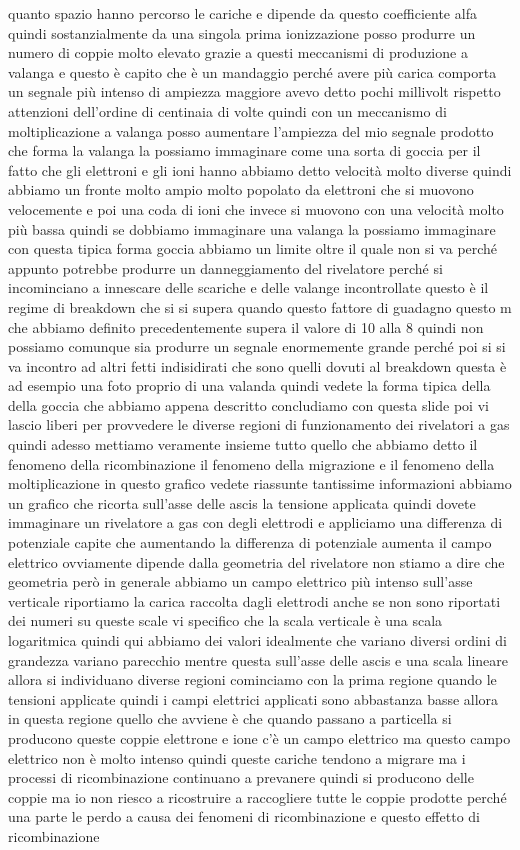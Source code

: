 quanto spazio hanno percorso le cariche e dipende da questo coefficiente alfa quindi sostanzialmente da una singola prima ionizzazione posso produrre un numero di coppie molto elevato grazie a questi meccanismi di produzione a valanga e questo è capito che è un mandaggio perché avere più carica comporta un segnale più intenso di ampiezza maggiore avevo detto pochi millivolt rispetto attenzioni dell'ordine di centinaia di volte quindi con un meccanismo di moltiplicazione a valanga posso aumentare l'ampiezza del mio segnale prodotto che forma la valanga la possiamo immaginare come una sorta di goccia per il fatto che gli elettroni e gli ioni hanno abbiamo detto velocità molto diverse quindi abbiamo un fronte molto ampio molto popolato da elettroni che si muovono velocemente e poi una coda di ioni che invece si muovono con una velocità molto più bassa quindi se dobbiamo immaginare una valanga la possiamo immaginare con questa tipica forma goccia abbiamo un limite oltre il quale non si va perché appunto potrebbe produrre un danneggiamento del rivelatore perché si incominciano a innescare delle scariche e delle valange incontrollate questo è il regime di breakdown che si si supera quando questo fattore di guadagno questo m che abbiamo definito precedentemente supera il valore di 10 alla 8 quindi non possiamo comunque sia produrre un segnale enormemente grande perché poi si si va incontro ad altri fetti indisidirati che sono quelli dovuti al breakdown questa è ad esempio una foto proprio di una valanda quindi vedete la forma tipica della della goccia che abbiamo appena descritto concludiamo con questa slide poi vi lascio liberi per provvedere le diverse regioni di funzionamento dei rivelatori a gas quindi adesso mettiamo veramente insieme tutto quello che abbiamo detto il fenomeno della ricombinazione il fenomeno della migrazione e il fenomeno della moltiplicazione in questo grafico vedete riassunte tantissime informazioni abbiamo un grafico che ricorta sull'asse delle ascis la tensione applicata quindi dovete immaginare un rivelatore a gas con degli elettrodi e appliciamo una differenza di potenziale capite che aumentando la differenza di potenziale aumenta il campo elettrico ovviamente dipende dalla geometria del rivelatore non stiamo a dire che geometria però in generale abbiamo un campo elettrico più intenso sull'asse verticale riportiamo la carica raccolta dagli elettrodi anche se non sono riportati dei numeri su queste scale vi specifico che la scala verticale è una scala logaritmica quindi qui abbiamo dei valori idealmente che variano diversi ordini di grandezza variano parecchio mentre questa sull'asse delle ascis e una scala lineare allora si individuano diverse regioni cominciamo con la prima regione quando le tensioni applicate quindi i campi elettrici applicati sono abbastanza basse allora in questa regione quello che avviene è che quando passano a particella si producono queste coppie elettrone e ione c'è un campo elettrico ma questo campo elettrico non è molto intenso quindi queste cariche tendono a migrare ma i processi di ricombinazione continuano a prevanere quindi si producono delle coppie ma io non riesco a ricostruire a raccogliere tutte le coppie prodotte perché una parte le perdo a causa dei fenomeni di ricombinazione e questo effetto di ricombinazione 